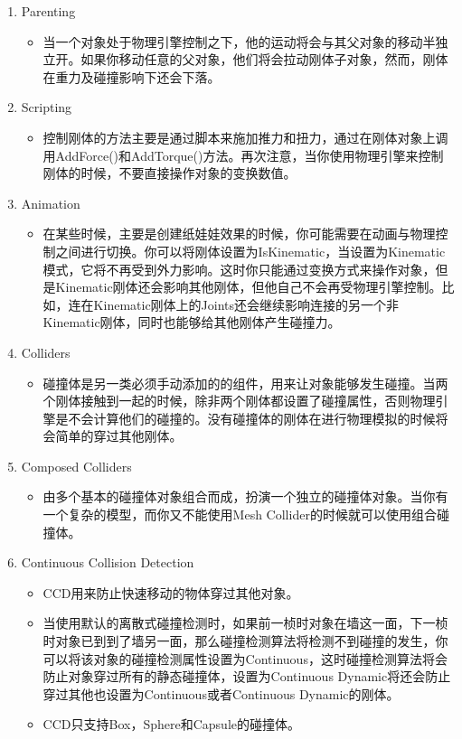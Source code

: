 \documentclass[9pt, b5paper]{article}
\begin{document}
\begin{enumerate}
\item Parenting
\label{sec:org2038eae}
\begin{itemize}
\item 当一个对象处于物理引擎控制之下，他的运动将会与其父对象的移动半独立开。如果你移动任意的父对象，他们将会拉动刚体子对象，然而，刚体在重力及碰撞影响下还会下落。
\end{itemize}
\item Scripting
\label{sec:org4f4b4c4}
\begin{itemize}
\item 控制刚体的方法主要是通过脚本来施加推力和扭力，通过在刚体对象上调用AddForce()和AddTorque()方法。再次注意，当你使用物理引擎来控制刚体的时候，不要直接操作对象的变换数值。
\end{itemize}
\item Animation
\label{sec:org1481ace}
\begin{itemize}
\item 在某些时候，主要是创建纸娃娃效果的时候，你可能需要在动画与物理控制之间进行切换。你可以将刚体设置为IsKinematic，当设置为Kinematic模式，它将不再受到外力影响。这时你只能通过变换方式来操作对象，但是Kinematic刚体还会影响其他刚体，但他自己不会再受物理引擎控制。比如，连在Kinematic刚体上的Joints还会继续影响连接的另一个非Kinematic刚体，同时也能够给其他刚体产生碰撞力。
\end{itemize}
\item Colliders
\label{sec:orgf89504c}
\begin{itemize}
\item 碰撞体是另一类必须手动添加的的组件，用来让对象能够发生碰撞。当两个刚体接触到一起的时候，除非两个刚体都设置了碰撞属性，否则物理引擎是不会计算他们的碰撞的。没有碰撞体的刚体在进行物理模拟的时候将会简单的穿过其他刚体。
\end{itemize}
\item Composed Colliders
\label{sec:org390c2da}
\begin{itemize}
\item 由多个基本的碰撞体对象组合而成，扮演一个独立的碰撞体对象。当你有一个复杂的模型，而你又不能使用Mesh Collider的时候就可以使用组合碰撞体。
\end{itemize}
\item Continuous Collision Detection
\label{sec:orgbf713ac}
\begin{itemize}
\item CCD用来防止快速移动的物体穿过其他对象。
\item 当使用默认的离散式碰撞检测时，如果前一桢时对象在墙这一面，下一桢时对象已到到了墙另一面，那么碰撞检测算法将检测不到碰撞的发生，你可以将该对象的碰撞检测属性设置为Continuous，这时碰撞检测算法将会防止对象穿过所有的静态碰撞体，设置为Continuous Dynamic将还会防止穿过其他也设置为Continuous或者Continuous Dynamic的刚体。
\item CCD只支持Box，Sphere和Capsule的碰撞体。
\end{itemize}
\end{enumerate}
\end{document}
